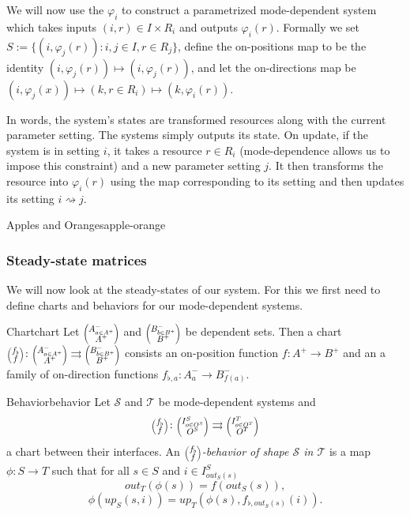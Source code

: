 \documentclass[12pt, a4paper]{article}
\theoremstyle{definition}
\theoremstyle{plain}
\theoremstyle{plain}
\theoremstyle{plain}
\theoremstyle{plain}
\theoremstyle{plain}
\theoremstyle{remark}
\theoremstyle{remark}
\newcommand{\mc}[1]{\mathcal{#1}}
\newcommand{\lens}[2]{\scaleobj{0.6}{\begin{pmatrix} \scaleobj{1.3}{{#1}} \\ \scaleobj{1.3}{{#2}} \end{pmatrix}}}
\begin{document}
We will now use the $\varphi_i$ to construct a parametrized mode-dependent system which takes inputs $(i, r) \in I \times R_i$ and outputs $\varphi_i(r)$. Formally we set $S := \{ (i,\varphi_j(r)) : i,j \in I, r \in R_j \}$, define the on-positions map to be the identity $(i,\varphi_j(r)) \mapsto (i,\varphi_j(r))$, and let the on-directions map be $(i,\varphi_j(x))\mapsto (k,r \in R_i) \mapsto (k,\varphi_i(r))$. 

In words, the system's states are transformed resources along with the current parameter setting. The systems simply outputs its state. On update, if the system is in setting $i$, it takes a resource $r \in R_i$ (mode-dependence allows us to impose this constraint) and a new parameter setting $j$. It then transforms the resource into $\varphi_i(r)$ using the map corresponding to its setting and then updates its setting $i \rightsquigarrow j$.

\begin{tcexample}{Apples and Oranges}{apple-orange}

\end{tcexample}

\subsubsection{Steady-state matrices}
We will now look at the steady-states of our system. For this we first need to define charts and behaviors for our mode-dependent systems.

\begin{tcdefinition}{Chart}{chart}
	Let $\lens{A^-_{a \in A^+}}{A^+}$ and $\lens{B^-_{b \in B^+}}{B^+}$ be dependent sets. Then a chart $\lens{f_\flat}{f} \colon \lens{A^-_{a \in A^+}}{A^+} \rightrightarrows \lens{B^-_{b \in B^+}}{B^+}$ consists an on-position function $f \colon A^+ \rightarrow B^+$ and an a family of on-direction functions $f_{\flat,a} \colon A^-_a \rightarrow B^-_{f(a)}$.
\end{tcdefinition}

\begin{tcdefinition}{Behavior}{behavior}
	Let $\mc{S}$ and $\mc{T}$ be mode-dependent systems and $$\lens{f_\flat}{f} \colon \lens{I^S_{o \in O^S}}{O^S} \rightrightarrows \lens{I^T_{o \in O^T}}{O^T}$$
	a chart between their interfaces. An \emph{$\lens{f_\flat}{f}$-behavior of shape $\mc{S}$ in $\mc{T}$} is a map $\phi: S \rightarrow T$ such that for all $s \in S$ and $i \in I^S_{out_S(s)}$
	$$out_T(\phi(s)) = f(out_S(s)), $$
	$$\phi(up_S(s,i)) = up_T(\phi(s), f_{\flat,out_S(s)}(i)).$$
\end{tcdefinition}
\end{document}
